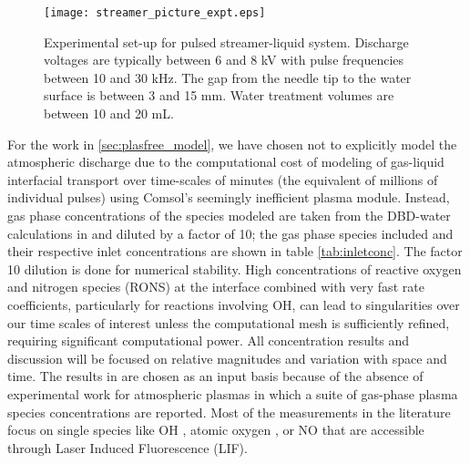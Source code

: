 \begin{figure}[htpb]
    \centering
        \texttt{[image: streamer\_picture\_expt.eps]}
    \caption{Experimental set-up for pulsed streamer-liquid system. Discharge voltages are typically between 6 and 8 kV with pulse frequencies between 10 and 30 kHz. The gap from the needle tip to the water surface is between 3 and 15 mm. Water treatment volumes are between 10 and 20 mL.}
    \label{fig:streamer_picture}
\end{figure}

For the work in \cref{sec:plasfree_model}, we have chosen not to explicitly model the atmospheric discharge due to the computational cost of modeling of gas-liquid interfacial transport over time-scales of minutes (the equivalent of millions of individual pulses) using Comsol's seemingly inefficient plasma module. Instead, gas phase concentrations of the species modeled are taken from the DBD-water calculations in \cite{Tian2014} and diluted by a factor of 10; the gas phase species included and their respective inlet concentrations are shown in table \ref{tab:inletconc}. The factor 10 dilution is done for numerical stability.  High concentrations of reactive oxygen and nitrogen species (RONS) at the interface combined with very fast rate coefficients, particularly for reactions involving OH, can lead to singularities over our time scales of interest unless the computational mesh is sufficiently refined, requiring significant computational power. All concentration results and discussion will be focused on relative magnitudes and variation with space and time. The results in \cite{Tian2014} are chosen as an input basis because of the absence of experimental work for atmospheric plasmas in which a suite of gas-phase plasma species concentrations are reported. Most of the measurements in the literature focus on single species like OH \cite{ono1998measurement,ono2001oh,nakagawa2011density,verreycken2012time}, atomic oxygen \cite{niemi2005absolute}, or NO \cite{kanazawa2003two} that are accessible through Laser Induced Fluorescence (LIF).

